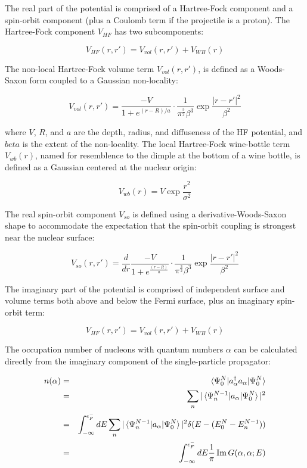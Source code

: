 The real part of the potential is comprised of a Hartree-Fock component and
a spin-orbit component (plus a Coulomb term if the projectile is a proton).
The Hartree-Fock component $V_{HF}$ has two subcomponents:

\begin{equation}
    V_{HF}(r,r') = V_{vol}(r,r') + V_{WB}(r)
\end{equation}

The non-local Hartree-Fock volume term $V_{vol}(r,r')$, is defined as
a Woods-Saxon form coupled to a Gaussian non-locality:

\begin{equation}
    V_{vol}(r,r') =
    \dfrac{-V}{1+e^{(r-R)/a}}\cdot\dfrac{1}{\pi^{\frac{3}{2}}\beta^{3}}
    \exp{\frac{|r-r'|^{2}}{\beta^{2}}}
\end{equation}

where $V$, $R$, and $a$ are the depth, radius, and diffuseness of the HF potential,
and $beta$ is the extent of the non-locality. The local Hartree-Fock wine-bottle
term $V_{wb}(r)$, named for resemblence to the dimple at the bottom of a wine
bottle, is defined as a Gaussian centered at the nuclear origin:

\begin{equation}
    V_{wb}(r) = V\exp{\frac{r^{2}}{\sigma^{2}}}
\end{equation}

The real spin-orbit component $V_{so}$
is defined using a derivative-Woods-Saxon shape to
accommodate the expectation that the spin-orbit coupling is strongest near the
nuclear surface:

\begin{equation}
    V_{so}(r,r') =
    \frac{d}{dr} \frac{-V}{1+e^{\frac{(r-R)}{a}}}\cdot\frac{1}{\pi^{\frac{3}{2}}\beta^{3}} \exp{\frac{|r-r'|^{2}}{\beta^{2}}}
\end{equation}

The imaginary part of the potential is comprised of independent surface and volume terms
both above and below the Fermi surface, plus an imaginary spin-orbit term:

\begin{equation}
    V_{HF}(r,r') = V_{vol}(r,r') + V_{WB}(r)
\end{equation}

The occupation number of nucleons with quantum numbers $\alpha$ can be
calculated directly from the imaginary component of the single-particle
propagator:

\begin{eqnarray}
    n(\alpha)
    & = & \braket{\Psi^{N}_{0}|a^{\dagger}_{\alpha}a_{\alpha}|\Psi^{N}_{0}}\\
    & = & \sum_{n}|\braket{\Psi^{N-1}_{n}|a_{\alpha}|\Psi^{N}_{0}}|^{2}\\
    & = & \int_{-\infty}^{\epsilon_{F}^{-}} dE
\sum_{n}|\braket{\Psi^{N-1}_{n}|a_{\alpha}|\Psi^{N}_{0}}|^{2}
\delta(E-(E^{N}_{0}-E^{N-1}_{n}))\\
& = & \int_{-\infty}^{\epsilon_{F}^{-}} dE \frac{1}{\pi}\operatorname{Im}G(\alpha,\alpha;E)
\end{eqnarray}


